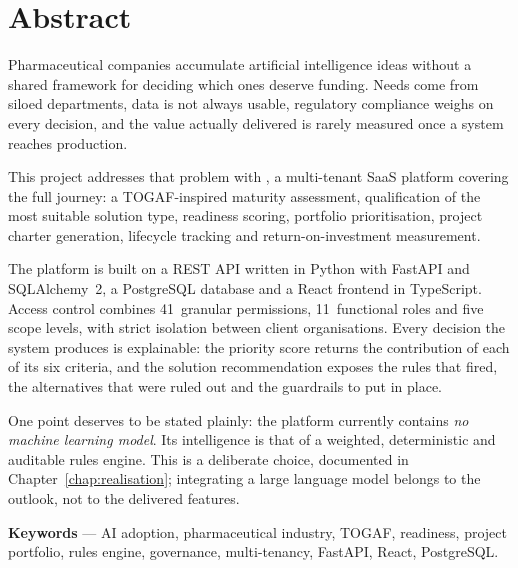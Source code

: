 \chapter*{Abstract}

Pharmaceutical companies accumulate artificial intelligence ideas without a shared
framework for deciding which ones deserve funding. Needs come from siloed departments,
data is not always usable, regulatory compliance weighs on every decision, and the
value actually delivered is rarely measured once a system reaches production.

This project addresses that problem with \appname, a multi-tenant SaaS platform
covering the full journey: a TOGAF-inspired maturity assessment, qualification of the
most suitable solution type, readiness scoring, portfolio prioritisation, project
charter generation, lifecycle tracking and return-on-investment measurement.

The platform is built on a REST API written in Python with FastAPI and SQLAlchemy~2, a
PostgreSQL database and a React frontend in TypeScript. Access control combines
41~granular permissions, 11~functional roles and five scope levels, with strict
isolation between client organisations. Every decision the system produces is
explainable: the priority score returns the contribution of each of its six criteria,
and the solution recommendation exposes the rules that fired, the alternatives that
were ruled out and the guardrails to put in place.

One point deserves to be stated plainly: the platform currently contains
\emph{no machine learning model}. Its intelligence is that of a weighted, deterministic
and auditable rules engine. This is a deliberate choice, documented in
Chapter~\ref{chap:realisation}; integrating a large language model belongs to the
outlook, not to the delivered features.

\vspace{0.8em}
\noindent\textbf{Keywords} — AI adoption, pharmaceutical industry, TOGAF, readiness,
project portfolio, rules engine, governance, multi-tenancy, FastAPI, React, PostgreSQL.

\cleardoublepage
\renewcommand{\contentsname}{Table des matières}
\tableofcontents

\cleardoublepage
\listoffigures
{}

\cleardoublepage
\listoftables
{}
